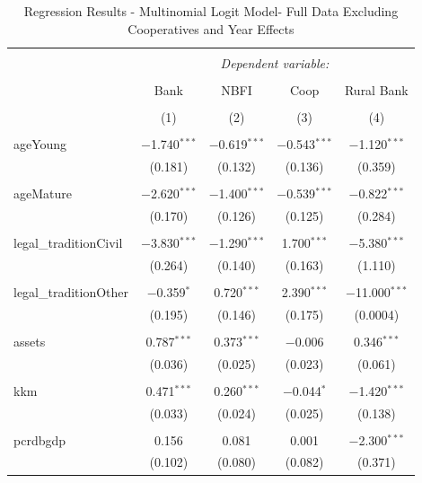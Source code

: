 \documentclass[a4paper, nobind]{templates/ociamthesis}
\begin{document}
\begin{table}[!htbp] \centering 
  \caption{Regression Results - Multinomial Logit Model- Full Data Excluding Cooperatives and Year Effects} 
  \label{} 
\footnotesize 
\begin{tabular}{@{\extracolsep{5pt}}lcccc} 
\\[-1.8ex]\hline 
\hline \\[-1.8ex] 
 & \multicolumn{4}{c}{\textit{Dependent variable:}} \\ 
\cline{2-5} 
\\[-1.8ex] & Bank & NBFI & Coop & Rural Bank \\ 
\\[-1.8ex] & (1) & (2) & (3) & (4)\\ 
\hline \\[-1.8ex] 
 ageYoung & $-$1.740$^{***}$ & $-$0.619$^{***}$ & $-$0.543$^{***}$ & $-$1.120$^{***}$ \\ 
  & (0.181) & (0.132) & (0.136) & (0.359) \\ 
  & & & & \\ 
 ageMature & $-$2.620$^{***}$ & $-$1.400$^{***}$ & $-$0.539$^{***}$ & $-$0.822$^{***}$ \\ 
  & (0.170) & (0.126) & (0.125) & (0.284) \\ 
  & & & & \\ 
 legal\_traditionCivil & $-$3.830$^{***}$ & $-$1.290$^{***}$ & 1.700$^{***}$ & $-$5.380$^{***}$ \\ 
  & (0.264) & (0.140) & (0.163) & (1.110) \\ 
  & & & & \\ 
 legal\_traditionOther & $-$0.359$^{*}$ & 0.720$^{***}$ & 2.390$^{***}$ & $-$11.000$^{***}$ \\ 
  & (0.195) & (0.146) & (0.175) & (0.0004) \\ 
  & & & & \\ 
 assets & 0.787$^{***}$ & 0.373$^{***}$ & $-$0.006 & 0.346$^{***}$ \\ 
  & (0.036) & (0.025) & (0.023) & (0.061) \\ 
  & & & & \\ 
 kkm & 0.471$^{***}$ & 0.260$^{***}$ & $-$0.044$^{*}$ & $-$1.420$^{***}$ \\ 
  & (0.033) & (0.024) & (0.025) & (0.138) \\ 
  & & & & \\ 
 pcrdbgdp & 0.156 & 0.081 & 0.001 & $-$2.300$^{***}$ \\ 
  & (0.102) & (0.080) & (0.082) & (0.371) \\ 

\end{tabular}
\end{table}
\end{document}
